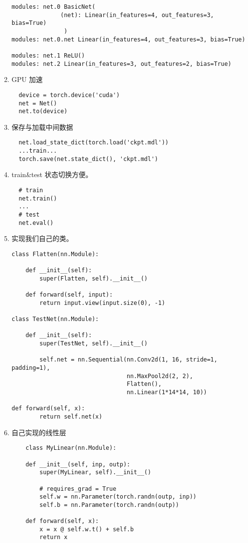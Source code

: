 \begin{enumerate}
\begin{lstlisting}
modules: net.0 BasicNet(
              (net): Linear(in_features=4, out_features=3, bias=True)
               )
modules: net.0.net Linear(in_features=4, out_features=3, bias=True)

modules: net.1 ReLU()
modules: net.2 Linear(in_features=3, out_features=2, bias=True)
  \end{lstlisting}
  \item GPU 加速
  \begin{lstlisting}
  device = torch.device('cuda')
  net = Net()
  net.to(device)
  \end{lstlisting}

  \item 保存与加载中间数据
  \begin{lstlisting}
  net.load_state_dict(torch.load('ckpt.mdl'))
  ...train...
  torch.save(net.state_dict(), 'ckpt.mdl')
  \end{lstlisting}

  \item train\&test 状态切换方便。
  \begin{lstlisting}
  # train
  net.train()
  ...
  # test
  net.eval()
  \end{lstlisting}
      \item 实现我们自己的类。
  \begin{lstlisting}
class Flatten(nn.Module):

    def __init__(self):
        super(Flatten, self).__init__()

    def forward(self, input):
        return input.view(input.size(0), -1)

class TestNet(nn.Module):

    def __init__(self):
        super(TestNet, self).__init__()

        self.net = nn.Sequential(nn.Conv2d(1, 16, stride=1, padding=1),
                                 nn.MaxPool2d(2, 2),
                                 Flatten(),
                                 nn.Linear(1*14*14, 10))

def forward(self, x):
        return self.net(x)
    \end{lstlisting}

    \item 自己实现的线性层
    \begin{lstlisting}
    class MyLinear(nn.Module):

    def __init__(self, inp, outp):
        super(MyLinear, self).__init__()

        # requires_grad = True
        self.w = nn.Parameter(torch.randn(outp, inp))
        self.b = nn.Parameter(torch.randn(outp))

    def forward(self, x):
        x = x @ self.w.t() + self.b
        return x
    \end{lstlisting}

\end{enumerate}



